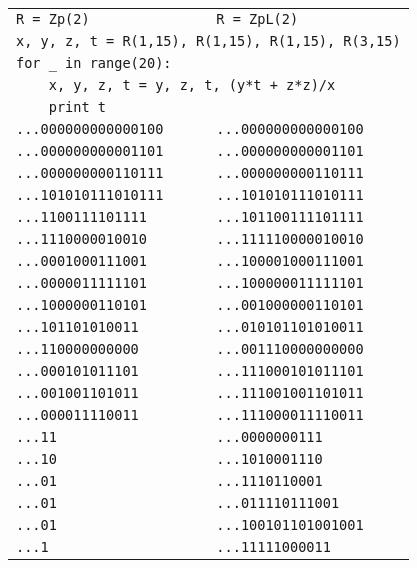 \documentclass[sigconf]{acmart}
\theoremstyle{definition}
\begin{document}
\begin{tabular}{|l|l|}
\verb?R = Zp(2)? & \verb?R = ZpL(2)? \\
\multicolumn{2}{|l|}{\tt x, y, z, t = R(1,15), R(1,15), R(1,15), R(3,15)} \\
\multicolumn{2}{|l|}{\tt for \_ in range(20):} \\
\multicolumn{2}{|l|}{\tt \ \ \ \ x, y, z, t = y, z, t, (y*t + z*z)/x} \\
\multicolumn{2}{|l|}{\tt \ \ \ \ print t} \\
\hfill\verb?...000000000000100? & \hfill\verb?...000000000000100? \\
\hfill\verb?...000000000001101? & \hfill\verb?...000000000001101? \\
\hfill\verb?...000000000110111? & \hfill\verb?...000000000110111? \\
\hfill\verb?...101010111010111? & \hfill\verb?...101010111010111? \\
\hfill\verb?...1100111101111? & \hfill\verb?...101100111101111? \\
\hfill\verb?...1110000010010? & \hfill\verb?...111110000010010? \\
\hfill\verb?...0001000111001? & \hfill\verb?...100001000111001? \\
\hfill\verb?...0000011111101? & \hfill\verb?...100000011111101? \\
\hfill\verb?...1000000110101? & \hfill\verb?...001000000110101? \\
\hfill\verb?...101101010011? & \hfill\verb?...010101101010011? \\
\hfill\verb?...110000000000? & \hfill\verb?...001110000000000? \\
\hfill\verb?...000101011101? & \hfill\verb?...111000101011101? \\
\hfill\verb?...001001101011? & \hfill\verb?...111001001101011? \\
\hfill\verb?...000011110011? & \hfill\verb?...111000011110011? \\
\hfill\verb?...11? & \hfill\verb?...0000000111? \\
\hfill\verb?...10? & \hfill\verb?...1010001110? \\
\hfill\verb?...01? & \hfill\verb?...1110110001? \\
\hfill\verb?...01? & \hfill\verb?...011110111001? \\
\hfill\verb?...01? & \hfill\verb?...100101101001001? \\
\hfill\verb?...1? & \hfill\verb?...11111000011? \\
\end{tabular}
\end{document}
